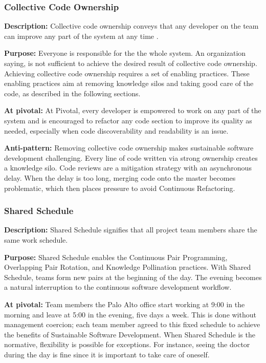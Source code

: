 \begin{table}[]
\subsubsection{Collective Code Ownership}

\textbf{Description:} Collective code ownership conveys that any developer on the team can improve any part of the system at any time \cite{ExtremeProgramming2004}. 

\textbf{Purpose:} Everyone is responsible for the the whole system. An organization saying,  is not sufficient to achieve the desired result of collective code ownership. Achieving collective code ownership requires a set of enabling practices. These enabling practices aim at removing knowledge silos and taking good care of the code, as described in the following sections.

\textbf{At pivotal:} At Pivotal, every developer is empowered to work on any part of the system and is encouraged to refactor any code section to improve its quality as needed, especially when code discoverability and readability is an issue.

\textbf{Anti-pattern:} Removing collective code ownership makes sustainable software development challenging. Every line of code written via strong ownership creates a knowledge silo. Code reviews are a mitigation strategy with an asynchronous delay. When the delay is too long, merging code onto the master becomes problematic, which then places pressure to avoid Continuous Refactoring.  

\subsubsection{Shared Schedule}
\textbf{Description:} Shared Schedule signifies that all project team members share the same work schedule. 

\textbf{Purpose:} Shared Schedule enables the Continuous Pair Programming, Overlapping Pair Rotation, and Knowledge Pollination practices. With Shared Schedule, teams form new pairs at the beginning of the day. The evening becomes a natural interruption to the continuous software development workflow. 

\textbf{At pivotal:} Team members the Palo Alto office start working at 9:00 in the morning and leave at 5:00 in the evening, five days a week. This is done without management coercion; each team member agreed to this fixed schedule to achieve the benefits of Sustainable Software Development. When Shared Schedule is the normative, flexibility is possible for exceptions. For instance, seeing the doctor during the day is fine since it is important to take care of oneself.


\end{table}
